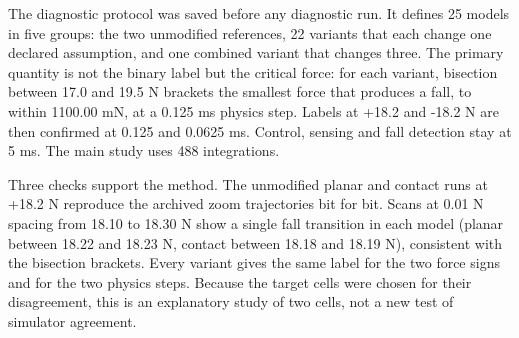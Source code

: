 \documentclass[11pt,a4paper]{article}
\begin{document}
The diagnostic protocol was saved before any diagnostic run. It defines 25 models in five groups: the two unmodified references, 22 variants that each change one declared assumption, and one combined variant that changes three. The primary quantity is not the binary label but the critical force: for each variant, bisection between 17.0 and 19.5 N brackets the smallest force that produces a fall, to within 1100.00 mN, at a 0.125 ms physics step. Labels at +18.2 and -18.2 N are then confirmed at 0.125 and 0.0625 ms. Control, sensing and fall detection stay at 5 ms. The main study uses 488 integrations.

Three checks support the method. The unmodified planar and contact runs at +18.2 N reproduce the archived zoom trajectories bit for bit. Scans at 0.01 N spacing from 18.10 to 18.30 N show a single fall transition in each model (planar between 18.22 and 18.23 N, contact between 18.18 and 18.19 N), consistent with the bisection brackets. Every variant gives the same label for the two force signs and for the two physics steps. Because the target cells were chosen for their disagreement, this is an explanatory study of two cells, not a new test of simulator agreement.

\clearpage
\end{document}
